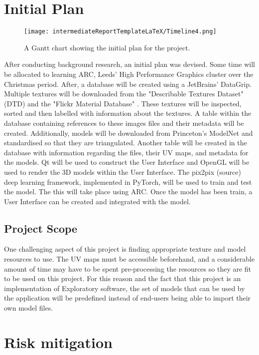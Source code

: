 \section{Initial Plan}
\label{sec:initialplan}
\begin{figure}[H]
    \label{fig:Timeline}
    \noindent\texttt{[image: intermediateReportTemplateLaTeX/Timeline4.png]}
    \caption{A Gantt chart showing the initial plan for the project.}
\end{figure}
After conducting background research, an initial plan was devised. Some time will be allocated to learning ARC, Leeds’ High Performance Graphics cluster over the Christmas period. After, a database will be created using a JetBrains’ DataGrip. Multiple textures will be downloaded from the "Describable Textures Dataset" (DTD) \cite{describingtexturesweb} and the "Flickr Material Database" \cite{materialperceptiondataset}. These textures will be inspected, sorted and then labelled with information about the textures. A table within the database containing references to these images files and their metadata will be created. Additionally, models will be downloaded from Princeton’s ModelNet \cite{volumetricshapesmodeldataset} and standardised so that they are triangulated. Another table will be created in the database with information regarding the files, their UV maps, and metadata for the models. Qt will be used to construct the User Interface and OpenGL will be used to render the 3D models within the User Interface. The pix2pix (source) deep learning framework, implemented in PyTorch, will be used to train and test the model. The this will take place using ARC. Once the model has been train, a User Interface can be created and integrated with the model. 
\subsection{Project Scope}
\label{subsec:projectscope}
One challenging aspect of this project is finding appropriate texture and model resources to use. The UV maps must be accessible beforehand, and a considerable amount of time may have to be spent pre-processing the resources so they are fit to be used on this project. For this reason and the fact that this project is an implementation of Exploratory software, the set of models that can be used by the application will be predefined instead of end-users being able to import their own model files.

\section{Risk mitigation}
